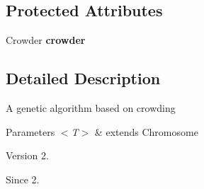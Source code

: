 \subsection*{Protected Attributes}
\begin{DoxyCompactItemize}
\item 
\hypertarget{classjenes_1_1algorithms_1_1_crowding_g_a_3_01_t_01extends_01_chromosome_01_4_aa747112afbb20cb4faec643ccc73e396}{Crowder {\bfseries crowder}}\label{classjenes_1_1algorithms_1_1_crowding_g_a_3_01_t_01extends_01_chromosome_01_4_aa747112afbb20cb4faec643ccc73e396}

\end{DoxyCompactItemize}


\subsection{Detailed Description}
A genetic algorithm based on crowding


\begin{DoxyParams}{Parameters}
{\em $<$\-T$>$} & extends Chromosome\\
\hline
\end{DoxyParams}
\begin{DoxyVersion}{Version}
2. 
\end{DoxyVersion}
\begin{DoxySince}{Since}
2. 
\end{DoxySince}


